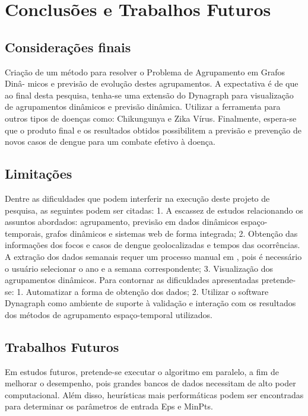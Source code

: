 \chapter{Conclusões e Trabalhos Futuros}
\label{chap:conclusoes-e-trabalhos-futuros}

\section{Considerações finais}
\label{sec:contribuicoes-do-trabalho}

Criação de um método para resolver o Problema de Agrupamento em Grafos Dinâ-
micos e previsão de evolução destes agrupamentos.
A expectativa é de que ao final desta pesquisa, tenha-se uma extensão do Dynagraph
para visualização de agrupamentos dinâmicos e previsão dinâmica.
Utilizar a ferramenta para outros tipos de doenças como: Chikungunya e Zika Vírus.
Finalmente, espera-se que o produto final e os resultados obtidos possibilitem a previsão e
prevenção de novos casos de dengue para um combate efetivo à doença.

\section{Limitações}
\label{sec:limitacoes}

Dentre as dificuldades que podem interferir na execução deste projeto de pesquisa,
as seguintes podem ser citadas:
1. A escassez de estudos relacionando os assuntos abordados: agrupamento, previsão em
dados dinâmicos espaço-temporais, grafos dinâmicos e sistemas web de forma integrada;
2. Obtenção das informações dos focos e casos de dengue geolocalizadas e tempos das
ocorrências. A extração dos dados semanais requer um processo manual em \cite{simda},
pois é necessário o usuário selecionar o ano e a semana correspondente;
3. Visualização dos agrupamentos dinâmicos.
Para contornar as dificuldades apresentadas pretende-se:
1. Automatizar a forma de obtenção dos dados;
2. Utilizar o software Dynagraph como ambiente de suporte à validação e interação com os
resultados dos métodos de agrupamento espaço-temporal utilizados.

\section{Trabalhos Futuros}
\label{sec:trabalhos-futuros}

Em estudos futuros, pretende-se executar o algoritmo em paralelo, a fim de melhorar o desempenho, pois grandes bancos de dados necessitam de alto poder computacional. Além disso, heurísticas mais performáticas podem ser encontradas para determinar os parâmetros de entrada Eps e MinPts.



